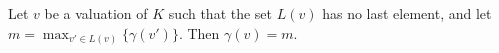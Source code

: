 Let $v$ be a valuation of $K$ such that the set $L(v)$ has no last element, and let $m = \max_{v' \in L(v)} \{\gamma(v')\}$. Then $\gamma(v) = m$.